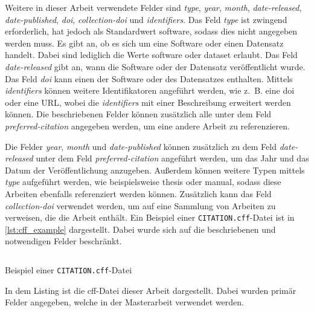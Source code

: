 Weitere in dieser Arbeit verwendete Felder sind \emph{type}, \emph{year}, \emph{month}, \emph{date-released}, \emph{date-published}, \emph{doi}, \emph{collection-doi} und \emph{identifiers}.
Das Feld \emph{type} ist zwingend erforderlich, hat jedoch als Standardwert \glqq software\grqq{}, sodass dies nicht angegeben werden muss.
Es gibt an, ob es sich um eine Software oder einen Datensatz handelt.
Dabei sind lediglich die Werte \glqq software\grqq{} oder \glqq dataset\grqq{} erlaubt.
Das Feld \emph{date-released} gibt an, wann die Software oder der Datensatz veröffentlicht wurde.
Das Feld \emph{doi} kann einen  der Software oder des Datensatzes enthalten.
Mittels \emph{identifiers} können weitere Identifikatoren angeführt werden, wie z.~B. eine \gls{doi} oder eine URL, wobei die \emph{identifiers} mit einer Beschreibung erweitert werden können.
Die beschriebenen Felder können zusätzlich alle unter dem Feld \emph{preferred-citation} angegeben werden, um eine andere Arbeit zu referenzieren.

Die Felder \emph{year}, \emph{month} und \emph{date-published} können zusätzlich zu dem Feld \emph{date-released} unter dem Feld \emph{preferred-citation} angeführt werden, um das Jahr und das Datum der Veröffentlichung anzugeben.
Außerdem können weitere Typen mittels \emph{type} aufgeführt werden, wie beispielsweise \glqq thesis\grqq{} oder \glqq manual\grqq{}, sodass diese Arbeiten ebenfalls referenziert werden können.
Zusätzlich kann das Feld \emph{collection-doi} verwendet werden, um auf eine Sammlung von Arbeiten zu verweisen, die die Arbeit enthält.
Ein Beispiel einer \texttt{CITATION.cff}-Datei ist in \autoref{lst:cff_example} dargestellt.
Dabei wurde sich auf die beschriebenen und notwendigen Felder beschränkt.

\begin{listing}
    \inputminted{yaml}{../CITATION.cff}
    \caption{Beispiel einer \texttt{CITATION.cff}-Datei}
    \label{lst:cff_example}
    \small
    In dem Listing ist die \gls{cff}-Datei dieser Arbeit dargestellt. Dabei wurden primär Felder angegeben, welche in der Masterarbeit verwendet werden.
\end{listing}

